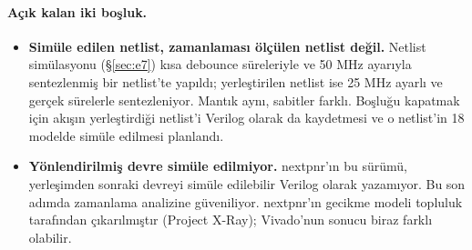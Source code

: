 \paragraph{Açık kalan iki boşluk.}
\begin{itemize}
  \item \textbf{Simüle edilen netlist, zamanlaması ölçülen netlist değil.} Netlist simülasyonu (§\ref{sec:e7}) kısa debounce süreleriyle ve 50 MHz ayarıyla sentezlenmiş bir netlist'te yapıldı; yerleştirilen netlist ise 25 MHz ayarlı ve gerçek sürelerle sentezleniyor. Mantık aynı, sabitler farklı. Boşluğu kapatmak için akışın yerleştirdiği netlist'i Verilog olarak da kaydetmesi ve o netlist'in 18 modelde simüle edilmesi planlandı.
  \item \textbf{Yönlendirilmiş devre simüle edilmiyor.} nextpnr'ın bu sürümü, yerleşimden sonraki devreyi simüle edilebilir Verilog olarak yazamıyor. Bu son adımda zamanlama analizine güveniliyor. nextpnr'ın gecikme modeli topluluk tarafından çıkarılmıştır (Project X-Ray); Vivado'nun sonucu biraz farklı olabilir.
\end{itemize}

